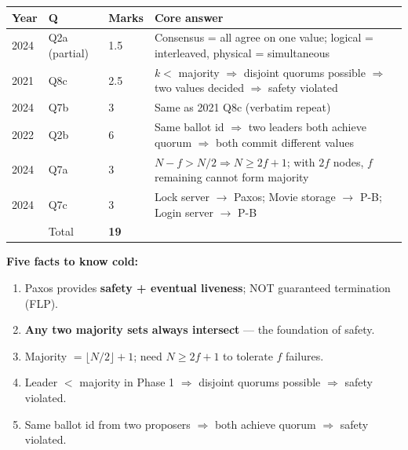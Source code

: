 \documentclass[12pt,a4paper]{article}
\begin{document}
\begin{center}
\begin{tabular}{@{}llll@{}}
\toprule
Year & Q & Marks & Core answer \\
\midrule
2024 & Q2a (partial) & 1.5 & Consensus = all agree on one value; logical = interleaved, physical = simultaneous \\
2021 & Q8c & 2.5 & $k <$ majority $\Rightarrow$ disjoint quorums possible $\Rightarrow$ two values decided $\Rightarrow$ safety violated \\
2024 & Q7b & 3 & Same as 2021 Q8c (verbatim repeat) \\
2022 & Q2b & 6 & Same ballot id $\Rightarrow$ two leaders both achieve quorum $\Rightarrow$ both commit different values \\
2024 & Q7a & 3 & $N - f > N/2 \Rightarrow N \geq 2f+1$; with $2f$ nodes, $f$ remaining cannot form majority \\
2024 & Q7c & 3 & Lock server $\to$ Paxos; Movie storage $\to$ P-B; Login server $\to$ P-B \\
\midrule
 & Total & \textbf{19} & \\
\bottomrule
\end{tabular}
\end{center}

\textbf{Five facts to know cold:}
\begin{enumerate}[noitemsep]
  \item Paxos provides \textbf{safety + eventual liveness}; NOT guaranteed termination (FLP).
  \item \textbf{Any two majority sets always intersect} --- the foundation of safety.
  \item Majority $= \lfloor N/2\rfloor + 1$; need $N \geq 2f+1$ to tolerate $f$ failures.
  \item Leader $<$ majority in Phase 1 $\Rightarrow$ disjoint quorums possible $\Rightarrow$ safety violated.
  \item Same ballot id from two proposers $\Rightarrow$ both achieve quorum $\Rightarrow$ safety violated.
\end{enumerate}
\end{document}
